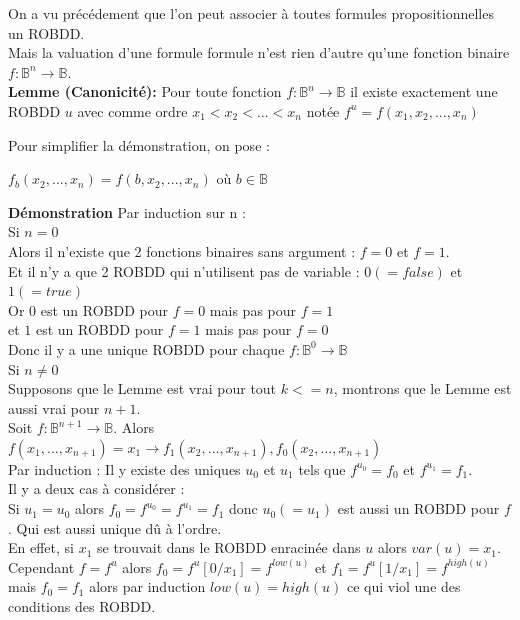 \documentclass[a4paper, oneside]{report}
\begin{document}
On a vu précédement que l'on peut associer à toutes formules propositionnelles un ROBDD.\\

Mais la valuation d'une formule formule n'est rien d'autre qu'une fonction binaire $f :\mathbb{B}^n \to \mathbb{B}$.\\

\textbf{Lemme (Canonicité): } Pour toute fonction $f :\mathbb{B}^n \to \mathbb{B}$ il existe exactement une ROBDD $u$ avec comme ordre $x_1 < x_2 < ... < x_n$ notée $f^u = f(x_1,x_2,...,x_n)$

Pour simplifier la démonstration, on pose :\\
\begin{center}
$f_b(x_2,...,x_n) = f(b,x_2,...,x_n)$ où $b \in \mathbb{B}$\\
\end{center}

\textbf{Démonstration } Par induction sur n :\\

Si $n = 0$\\
Alors il n'existe que 2 fonctions binaires sans argument : $f = 0$ et $f = 1$.\\
Et il n'y a que 2 ROBDD qui n'utilisent pas de variable : $0 (= false)$ et $1 (= true)$\\
Or $0$ est un ROBDD pour $f = 0$ mais pas pour $f = 1$ \\
et $1$ est un ROBDD pour $f = 1$ mais pas pour $f = 0$ \\
Donc il y a une unique ROBDD pour chaque $f :\mathbb{B}^0 \to \mathbb{B}$ \\

Si $n \neq 0$\\
Supposons que le Lemme est vrai pour tout $k <= n$, montrons que le Lemme est aussi vrai pour $n+1$.\\

Soit $f :\mathbb{B}^{n+1} \to \mathbb{B}$.
Alors $f(x_1,...,x_{n+1}) = x_1 \rightarrow f_1(x_2,...,x_{n+1}), f_0(x_2,...,x_{n+1})$\\
Par induction : Il y existe des uniques $u_0$ et $u_1$ tels que $f^{u_0} = f_0$ et $f^{u_1} = f_1$.\\

Il y a deux cas à considérer :\\

Si $u_1 = u_0$ alors $f_0 = f^{u_0} = f^{u_1} = f_1$ donc $u_0 (= u_1)$ est aussi un ROBDD pour $f$. Qui est aussi unique dû à l'ordre.\\
En effet, si $x_1$ se trouvait dans le ROBDD enracinée dans $u$ alors $var(u) = x_1$.\\
Cependant $f = f^u$ alors $f_0 = f^u[0/x_1] = f^{low(u)}$ et $f_1 = f^u[1/x_1] = f^{high(u)}$ mais $f_0 = f_1$ alors par induction $low(u) = high(u)$ ce qui viol une des conditions des ROBDD.\\
\end{document}
